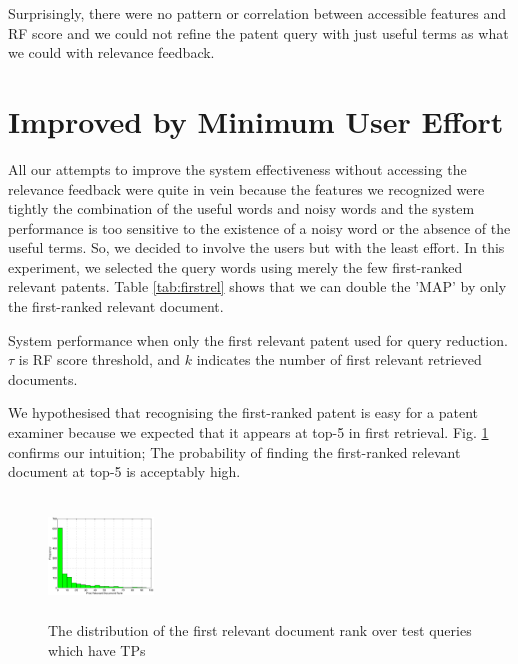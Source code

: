 \documentclass{sig-alternate}
\begin{document}
Surprisingly, there were no pattern or correlation between accessible features and RF score and we could not refine the patent query with just useful terms as what we could with relevance feedback. 
\section{Improved by Minimum User Effort}
All our attempts to improve the system effectiveness without accessing the relevance feedback were quite in vein because the features we recognized were tightly the combination of the useful words and noisy words and the system performance is too sensitive to the existence of a noisy word or the absence of the useful terms. So, we decided to involve the users but with the least effort. In this experiment, we selected the query words using merely the few first-ranked relevant patents. Table \ref{tab:firstrel} shows that we can double the 'MAP' by only the first-ranked relevant document.
\begin{table}[htpb]
  \begin{center}
   \caption{System performance when only the first relevant patent used for query reduction. $\tau$ is RF score threshold, and $k$ indicates the number of first relevant retrieved documents.}\vspace{3mm}
     
  \label{tab:firstrel}
  \end{center}  
\end{table}
 We hypothesised that recognising the first-ranked patent is easy for a patent examiner because we expected that it appears at top-5 in first retrieval. Fig. \ref{fig:FirstTPRankHisto} confirms our intuition; The probability of finding the first-ranked relevant document at top-5 is acceptably high.   
\begin{figure}[htpb]
   \centering
   \includegraphics[width=0.25\textwidth,height=32mm]{figs/FirstTPRank.eps}
   \caption{The distribution of the first relevant document rank over test queries which have TPs}   
   \label{fig:FirstTPRankHisto} 
\end{figure}
\end{document}
